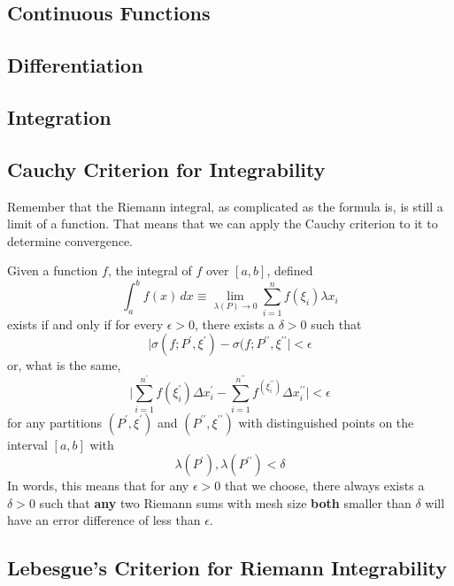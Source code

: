 \subsection{Continuous Functions}

\subsection{Differentiation}

\subsection{Integration}

\subsection{Cauchy Criterion for Integrability} 

  Remember that the Riemann integral, as complicated as the formula is, is still a limit of a function. That means that we can apply the Cauchy criterion to it to determine convergence. 

  \begin{lemma}
    Given a function $f$, the integral of $f$ over $[a, b]$, defined
    \[\int_a^b f(x)\,dx \equiv \lim_{\lambda(P) \rightarrow 0} \sum_{i=1}^n f(\xi_i) \lambda x_i\]
    exists if and only if for every $\epsilon>0$, there exists a $\delta>0$ such that 
    \[\big| \sigma(f; P^\prime, \xi^\prime) - \sigma(f; P^{\prime\prime}, \xi^{\prime\prime} \big| < \epsilon\]
    or, what is the same, 
    \[\Bigg| \sum_{i=1}^{n^\prime} f(\xi_i^\prime) \Delta x_i^\prime - \sum_{i=1}^{n^{\prime\prime}} f^(\xi_i^{\prime\prime}) \Delta x_i^{\prime\prime} \Bigg| < \epsilon\]
    for any partitions $(P^\prime, \xi^\prime)$ and $(P^{\prime\prime}, \xi^{\prime\prime})$ with distinguished points on the interval $[a, b]$ with
    \[\lambda(P^\prime), \lambda(P^{\prime\prime}) < \delta\]
    In words, this means that for any $\epsilon>0$ that we choose, there always exists a $\delta>0$ such that \textbf{any} two Riemann sums with mesh size \textbf{both} smaller than $\delta$ will have an error difference of less than $\epsilon$. 
  \end{lemma}

\subsection{Lebesgue's Criterion for Riemann Integrability}

